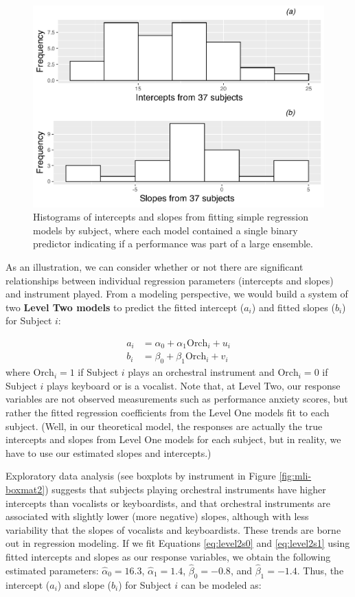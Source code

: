 \documentclass[
]{krantz}
\begin{document}
\begin{figure}

{\centering \includegraphics[width=0.6\linewidth]{bookdown-BeyondMLR_files/figure-latex/mli-histmat2-1} 

}

\caption{Histograms of intercepts and slopes from fitting simple regression models by subject, where each model contained a single binary predictor indicating if a performance was part of a large ensemble.}\label{fig:mli-histmat2}
\end{figure}

As an illustration, we can consider whether or not there are significant relationships between individual regression parameters (intercepts and slopes) and instrument played. From a modeling perspective, we would build a system of two \textbf{Level Two models}  to predict the fitted intercept (\(a_{i}\)) and fitted slopes (\(b_{i}\)) for Subject \(i\):

\begin{align}
a_{i} & =  \alpha_{0}+\alpha_{1}\textrm{Orch}_{i}+u_{i}
\label{eq:level2s0}  \\
b_{i} & =  \beta_{0}+\beta_{1}\textrm{Orch}_{i}+v_{i}
\label{eq:level2s1}
\end{align}
where \(\textrm{Orch}_{i}=1\) if Subject \(i\) plays an orchestral instrument and \(\textrm{Orch}_{i}=0\) if Subject \(i\) plays keyboard or is a vocalist. Note that, at Level Two, our response variables are not observed measurements such as performance anxiety scores, but rather the fitted regression coefficients from the Level One models fit to each subject. (Well, in our theoretical model, the responses are actually the true intercepts and slopes from Level One models for each subject, but in reality, we have to use our estimated slopes and intercepts.)

Exploratory data analysis (see boxplots by instrument in Figure \ref{fig:mli-boxmat2}) suggests that subjects playing orchestral instruments have higher intercepts than vocalists or keyboardists, and that orchestral instruments are associated with slightly lower (more negative) slopes, although with less variability that the slopes of vocalists and keyboardists. These trends are borne out in regression modeling. If we fit Equations \eqref{eq:level2s0} and \eqref{eq:level2s1} using fitted intercepts and slopes as our response variables, we obtain the following estimated parameters: \(\hat{\alpha}_{0}=16.3\), \(\hat{\alpha}_{1}=1.4\), \(\hat{\beta}_{0}=-0.8\), and \(\hat{\beta}_{1}=-1.4\). Thus, the intercept (\(a_{i}\)) and slope (\(b_{i}\)) for Subject \(i\) can be modeled as:
\end{document}
